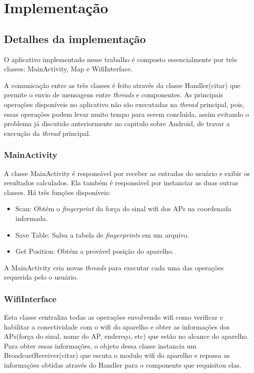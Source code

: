 \chapter{Implementação}	 
\label{implementacao}
  
\section{Detalhes da implementação}

  O aplicativo implementado nesse trabalho é composto essencialmente por três  classes: MainActivity, 
  Map e WifiInterface. 
  
  A comunicação entre as três classes é feito através da classe Handler(citar) que permite o envio de 
  mensagens entre \textit{threads} e componentes. As principais operações disponíveis no aplicativo não 
  são executadas na \textit{thread} principal, pois, essas operações podem levar muito tempo para serem 
  concluída, assim evitando o problema já discutido anteriormente no capitulo sobre Android,
  de travar a execução da \textit{thread} principal.
  
  \subsection{MainActivity}
  A classe MainActivity é responsável por receber as entradas do usuário e exibir os resultados calculados.
  Ela também é responsável por instanciar as duas outras classes. Há três funções disponíveis: 
  \begin{itemize}
   \item Scan: Obtém o \textit{fingerprint} da força do sinal wifi dos APs na coordenada informada.
   \item Save Table: Salva a tabela de \textit{fingerprints} em um arquivo.
   \item Get Position: Obtém a provável posição do aparelho. 
  \end{itemize}

  A MainActivity cria novas \textit{threads} para executar cada uma das operações requerida pelo o usuário.
  
  \subsection{WifiInterface}
  
  Esta classe centraliza todas as operações envolvendo wifi como verificar e habilitar a conectividade
  com o wifi do aparelho e obter as informações dos APs(força do sinal, nome do AP, endereço, etc) 
  que estão no alcance do aparelho. Para obter essas informações, o objeto dessa classe
  instancia um BroadcastReceiver(citar) que escuta o modulo wifi do aparelho e repassa 
  as informações obtidas através do Handler para o componente que requisitou elas.
  
